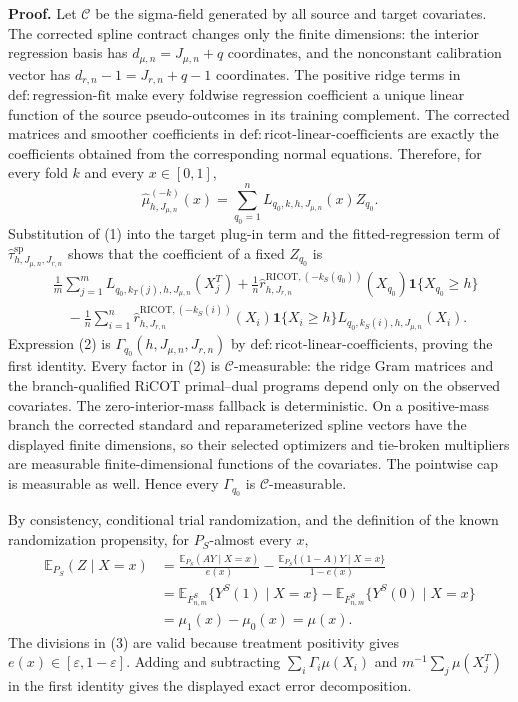 \textbf{Proof.}
Let \(\mathcal C\) be the sigma-field generated by all source and target covariates. The corrected spline contract changes only the finite dimensions: the interior regression basis has \(d_{\mu,n}=J_{\mu,n}+q\) coordinates, and the nonconstant calibration vector has \(d_{r,n}-1=J_{r,n}+q-1\) coordinates. The positive ridge terms in \(\mathrm{def:regression\text{-}fit}\) make every foldwise regression coefficient a unique linear function of the source pseudo-outcomes in its training complement. The corrected matrices and smoother coefficients in \(\mathrm{def:ricot\text{-}linear\text{-}coefficients}\) are exactly the coefficients obtained from the corresponding normal equations. Therefore, for every fold \(k\) and every \(x\in[0,1]\),
\[
\widehat\mu^{(-k)}_{h,J_{\mu,n}}(x)
=\sum_{q_0=1}^n L_{q_0,k,h,J_{\mu,n}}(x)Z_{q_0}.
\tag{1}
\]
Substitution of (1) into the target plug-in term and the fitted-regression term of \(\widehat\tau^{\mathrm{sp}}_{h,J_{\mu,n},J_{r,n}}\) shows that the coefficient of a fixed \(Z_{q_0}\) is
\[
\begin{aligned}
{}&\frac1m\sum_{j=1}^mL_{q_0,k_T(j),h,J_{\mu,n}}(X_j^T)
+\frac1n\widehat r^{\mathrm{RICOT},(-k_S(q_0))}_{h,J_{r,n}}(X_{q_0})\mathbf 1\{X_{q_0}\ge h\}\\
&\quad-\frac1n\sum_{i=1}^n
\widehat r^{\mathrm{RICOT},(-k_S(i))}_{h,J_{r,n}}(X_i)\mathbf 1\{X_i\ge h\}
L_{q_0,k_S(i),h,J_{\mu,n}}(X_i).
\end{aligned}
\tag{2}
\]
Expression (2) is \(\Gamma_{q_0}(h,J_{\mu,n},J_{r,n})\) by \(\mathrm{def:ricot\text{-}linear\text{-}coefficients}\), proving the first identity. Every factor in (2) is \(\mathcal C\)-measurable: the ridge Gram matrices and the branch-qualified RiCOT primal--dual programs depend only on the observed covariates. The zero-interior-mass fallback is deterministic. On a positive-mass branch the corrected standard and reparameterized spline vectors have the displayed finite dimensions, so their selected optimizers and tie-broken multipliers are measurable finite-dimensional functions of the covariates. The pointwise cap is measurable as well. Hence every \(\Gamma_{q_0}\) is \(\mathcal C\)-measurable.

By consistency, conditional trial randomization, and the definition of the known randomization propensity, for \(P_S\)-almost every \(x\),
\[
\begin{aligned}
\mathbb E_{P_S}(Z\mid X=x)
&=\frac{\mathbb E_{P_S}(AY\mid X=x)}{e(x)}
-\frac{\mathbb E_{P_S}\{(1-A)Y\mid X=x\}}{1-e(x)}\\
&=\mathbb E_{F^S_{n,m}}\{Y^S(1)\mid X=x\}
-\mathbb E_{F^S_{n,m}}\{Y^S(0)\mid X=x\}\\
&=\mu_1(x)-\mu_0(x)=\mu(x).
\end{aligned}
\tag{3}
\]
The divisions in (3) are valid because treatment positivity gives \(e(x)\in[\varepsilon,1-\varepsilon]\). Adding and subtracting \(\sum_i\Gamma_i\mu(X_i)\) and \(m^{-1}\sum_j\mu(X_j^T)\) in the first identity gives the displayed exact error decomposition.

